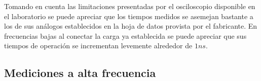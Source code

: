 Tomando en cuenta las limitaciones presentadas por el osciloscopio disponible en el laboratorio se puede apreciar que los tiempos medidos se asemejan bastante a los de sus análogos establecidos en la hoja de datos provista por el fabricante. En frecuencias bajas al conectar la carga  ya establecida se puede apreciar que sus tiempos de operación se incrementan levemente alrededor de $1 ns$. 

\subsection{Mediciones a alta frecuencia}






